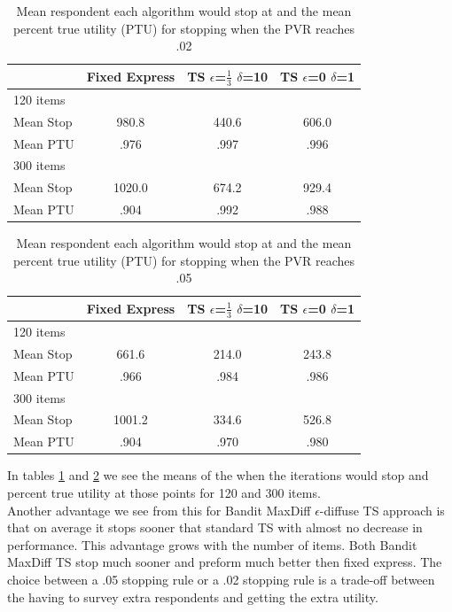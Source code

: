 \documentclass[nonblindrev]{informs3}
\begin{document}
\begin{table}
\begin{center}
\begin{tabular}{l | c | c | c }
 & Fixed Express &  TS $\epsilon$=$\frac{1}{3}$ $\delta$=10  &TS $\epsilon$=0 $\delta$=1  \\
\hline
120 items&&&\\
Mean Stop&  980.8 &  440.6 &  606.0 \\
Mean PTU& .976 & .997 & .996 \\
\hline
300 items&&&\\
Mean Stop& 1020.0 &  674.2 &  929.4\\
Mean PTU& .904 & .992 & .988 \\
\hline
\end{tabular}
\end{center}
\caption{Mean respondent each algorithm would stop at and the mean percent true utility (PTU) for stopping when the PVR reaches .02}
\label{table:stop2}
\end{table}
\begin{table}
\begin{center}
\begin{tabular}{l | c | c | c }

 & Fixed Express &  TS $\epsilon$=$\frac{1}{3}$ $\delta$=10  &TS $\epsilon$=0 $\delta$=1 \\
\hline
120 items&&&\\
Mean Stop& 661.6 &  214.0 & 243.8 \\
Mean PTU& .966 & .984 & .986 \\
\hline
300 items&&&\\
Mean Stop& 1001.2 &  334.6 &  526.8\\
Mean PTU& .904 & .970 & .980 \\
\hline
\end{tabular}
\end{center}
\caption{Mean respondent each algorithm would stop at and the mean percent true utility (PTU) for stopping when the PVR reaches .05}
\label{table:stop5}
\end{table}
In tables \ref{table:stop2} and \ref{table:stop5} we see the means of the when the iterations would stop and percent true utility at those points for 120 and 300 items.\\ Another advantage we see from this for Bandit MaxDiff $\epsilon$-diffuse TS approach is that on average it stops sooner that standard TS with almost no decrease in performance. This advantage grows with the number of items. Both Bandit MaxDiff TS stop much sooner and preform much better then fixed express. The choice between a .05 stopping rule or a .02 stopping rule is a trade-off between the having to survey extra respondents and getting the extra utility.
\end{document}
